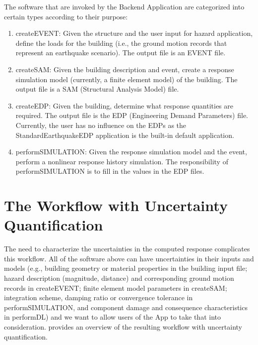 The software that are invoked by the Backend Application are categorized into certain types according to their purpose:
\begin{enumerate}
    \item createEVENT: Given the structure and the user input for hazard application, define the loads for the building (i.e., the ground motion records that represent an earthquake scenario). The output file is an EVENT file.
    \item createSAM: Given the building description and event, create a response simulation model (currently, a finite element model) of the building. The output file is a SAM (Structural Analysis Model) file.
    \item createEDP: Given the building, determine what response quantities are required. The output file is the EDP (Engineering Demand Parameters) file. Currently, the user has no influence on the EDPs as the StandardEarthquakeEDP application is the built-in default application.
    \item performSIMULATION: Given the response simulation model and the event, perform a nonlinear response history simulation. The responsibility of performSIMULATION is to fill in the values in the EDP files.
\end{enumerate}

\section{The Workflow with Uncertainty Quantification}

The need to characterize the uncertainties in the computed response complicates this workflow. All of the software above can have uncertainties in their inputs and models (e.g., building geometry or material properties in the building input file; hazard description (magnitude, distance) and corresponding ground motion records in createEVENT; finite element model parameters in createSAM; integration scheme, damping ratio or convergence tolerance in performSIMULATION, and component damage and consequence characteristics in performDL) and we want to allow users of the \texttt{\getsoftwarename{}} App to take that into consideration.  provides an overview of the resulting workflow with uncertainty quantification.\\


